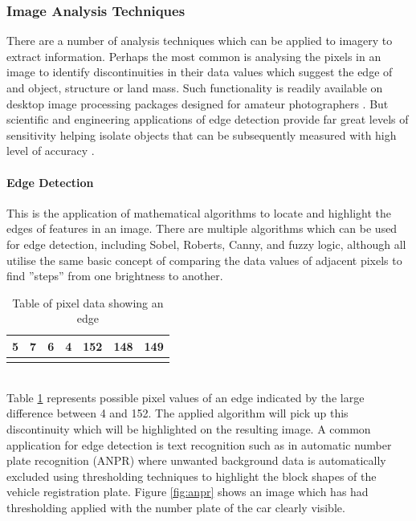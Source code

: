 \subsubsection{Image Analysis Techniques}
	There are a number of analysis techniques which can be applied to imagery to extract information. Perhaps the most common is analysing the pixels in an image to identify discontinuities in their data values which suggest the edge of and object, structure or land mass. Such functionality is readily available on desktop image processing packages designed for amateur photographers \citep{photoshop}. But scientific and engineering applications of edge detection provide far great levels of sensitivity helping isolate objects that can be subsequently measured with high level of accuracy \citep{matlabedge}.
	\paragraph{Edge Detection}
	This is the application of mathematical algorithms to locate and highlight the edges of features in an image. There are multiple algorithms which can be used for edge detection, including Sobel, Roberts, Canny, and fuzzy logic, although all utilise the same basic concept of comparing the data values of adjacent pixels to find ”steps” from one  brightness to another.
	\begin{table}[h!]
		\centering
		\caption{Table of pixel data showing an edge}
		\label{tab:edgePixels}
		\begin{tabular}{|c|c|c|c|c|c|c|}
			\hline
			5&7&6&4&152&148&149\\
			\hline
			\cellcolor[HTML]{0D0D0D}&
			\cellcolor[HTML]{121212}&
			\cellcolor[HTML]{0F0F0F}&
			\cellcolor[HTML]{0a0a0a}&
			\cellcolor[HTML]{989898}&
			\cellcolor[HTML]{949494}&
			\cellcolor[HTML]{959595}\\
			\hline
		\end{tabular}
	\end{table}\\
	Table \ref{tab:edgePixels} represents possible pixel values of an edge indicated by the large difference between 4 and 152. The applied algorithm will pick up this discontinuity which will be highlighted on the resulting image. A common application for edge detection is text recognition such as in automatic number plate recognition (ANPR) \citep{anpr} where unwanted background data is automatically excluded using thresholding techniques to highlight the block shapes of the vehicle registration plate. Figure \ref{fig:anpr} shows an image which has had  thresholding applied with the number plate of the car clearly visible.
